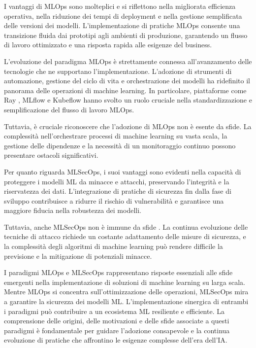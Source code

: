 I vantaggi di MLOps sono molteplici e si riflettono nella migliorata efficienza operativa, nella riduzione dei tempi di deployment e nella gestione semplificata delle versioni dei modelli. L'implementazione di pratiche MLOps consente una transizione fluida dai prototipi agli ambienti di produzione, garantendo un flusso di lavoro ottimizzato e una risposta rapida alle esigenze del business.

L'evoluzione del paradigma MLOps è strettamente connessa all'avanzamento delle tecnologie che ne supportano l'implementazione. L'adozione di strumenti di automazione, gestione del ciclo di vita e orchestrazione dei modelli ha ridefinito il panorama delle operazioni di machine learning. In particolare, piattaforme come Ray \cite{ray}, MLflow \cite{mlflow} e Kubeflow \cite{kubeflow} hanno svolto un ruolo cruciale nella standardizzazione e semplificazione del flusso di lavoro MLOps.

Tuttavia, è cruciale riconoscere che l'adozione di MLOps non è esente da sfide. La complessità nell'orchestrare processi di machine learning su vasta scala, la gestione delle dipendenze e la necessità di un monitoraggio continuo possono presentare ostacoli significativi.

Per quanto riguarda MLSecOps, i suoi vantaggi sono evidenti nella capacità di proteggere i modelli ML da minacce e attacchi, preservando l'integrità e la riservatezza dei dati. L'integrazione di pratiche di sicurezza fin dalla fase di sviluppo contribuisce a ridurre il rischio di vulnerabilità e garantisce una maggiore fiducia nella robustezza dei modelli.

Tuttavia, anche MLSecOps non è immune da sfide \cite{adv_ml_2}. La continua evoluzione delle tecniche di attacco richiede un costante adattamento delle misure di sicurezza, e la complessità degli algoritmi di machine learning può rendere difficile la previsione e la mitigazione di potenziali minacce.

I paradigmi MLOps e MLSecOps rappresentano risposte essenziali alle sfide emergenti nella implementazione di soluzioni di machine learning su larga scala. Mentre MLOps si concentra sull'ottimizzazione delle operazioni, MLSecOps mira a garantire la sicurezza dei modelli ML. L'implementazione sinergica di entrambi i paradigmi può contribuire a un ecosistema ML resiliente e efficiente. La comprensione delle origini, delle motivazioni e delle sfide associate a questi paradigmi è fondamentale per guidare l'adozione consapevole e la continua evoluzione di pratiche che affrontino le esigenze complesse dell'era dell'IA.